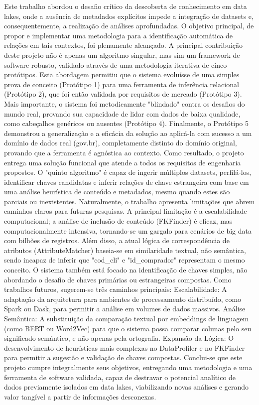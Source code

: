 \documentclass[12pt, a4paper]{article}
\begin{document}
Este trabalho abordou o desafio crítico da descoberta de conhecimento em data lakes, onde a ausência de metadados explícitos impede a integração de datasets e, consequentemente, a realização de análises aprofundadas. 
O objetivo principal, de propor e implementar uma metodologia para a identificação automática de relações em tais contextos, foi plenamente alcançado. 
A principal contribuição deste projeto não é apenas um algoritmo singular, mas sim um framework de software robusto, validado através de uma metodologia iterativa de cinco protótipos. 
Esta abordagem permitiu que o sistema evoluísse de uma simples prova de conceito (Protótipo 1) para uma ferramenta de inferência relacional (Protótipo 2), que foi então validada por requisitos de mercado (Protótipo 3). 
Mais importante, o sistema foi metodicamente "blindado" contra os desafios do mundo real, provando sua capacidade de lidar com dados de baixa qualidade, como cabeçalhos genéricos ou ausentes (Protótipo 4). 
Finalmente, o Protótipo 5 demonstrou a generalização e a eficácia da solução ao aplicá-la com sucesso a um domínio de dados real (gov.br), completamente distinto do domínio original, provando que a ferramenta é agnóstica ao contexto. 
Como resultado, o projeto entrega uma solução funcional que atende a todos os requisitos de engenharia propostos. 
O "quinto algoritmo" é capaz de ingerir múltiplos datasets, perfilá-los, identificar chaves candidatas e inferir relações de chave estrangeira com base em uma análise heurística de conteúdo e metadados, mesmo quando estes são parciais ou inexistentes.
Naturalmente, o trabalho apresenta limitações que abrem caminhos claros para futuras pesquisas. A principal limitação é a escalabilidade computacional; 
a análise de inclusão de conteúdo (FKFinder) é eficaz, mas computacionalmente intensiva, tornando-se um gargalo para cenários de big data com bilhões de registros. 
Além disso, a atual lógica de correspondência de atributos (AttributeMatcher) baseia-se em similaridade textual, não semântica, sendo incapaz de inferir que "cod\_cli" e "id\_comprador" representam o mesmo conceito. 
O sistema também está focado na identificação de chaves simples, não abordando o desafio de chaves primárias ou estrangeiras compostas. 
Como trabalhos futuros, sugerem-se três caminhos principais: 
Escalabilidade: A adaptação da arquitetura para ambientes de processamento distribuído, como Spark ou Dask, para permitir a análise em volumes de dados massivos. 
Análise Semântica: A substituição da comparação textual por embeddings de linguagem (como BERT ou Word2Vec) para que o sistema possa comparar colunas pelo seu significado semântico, e não apenas pela ortografia. 
Expansão da Lógica: O desenvolvimento de heurísticas mais complexas no DataProfiler e no FKFinder para permitir a sugestão e validação de chaves compostas. 
Conclui-se que este projeto cumpre integralmente seus objetivos, entregando uma metodologia e uma ferramenta de software validada, capaz de destravar o potencial analítico de dados previamente isolados em data lakes, viabilizando novas análises e gerando valor tangível a partir de informações desconexas. 
\end{document}
